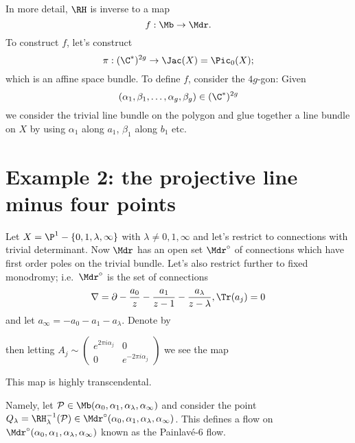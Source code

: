 \documentclass[etingof-dmod.tex]{subfiles}
\begin{document}
In more detail, $\RH$ is inverse to a map $$f : \Mb \rightarrow \Mdr.$$ To
construct $f$, let's construct $$\pi: (\C^*)^{2g} \rightarrow \Jac(X) =
\Pic_{0}(X);$$ which is an affine space bundle. To define $f$, consider the
$4g$-gon:
Given $$(\alpha_1,\beta_1, \ldots, \alpha_g,\beta_g) \in (\C^*)^{2g}$$ we
consider the trivial line bundle on the polygon and glue
together a line bundle on $X$ by using $\alpha_1$ along $a_1$, $\beta_1$ along $b_1$ etc.
\section{Example 2: the projective line minus four points}
Let $X = \P^1 - \{0,1,\lambda, \infty\}$ with $\lambda \neq 0,1,\infty$ and
let's restrict to connections with trivial determinant. Now $\Mdr$ has an open
set $\Mdr^{\circ}$ of connections which have first order poles on the trivial
bundle. Let's also restrict further to fixed monodromy; i.e.\ $\Mdr^{\circ}$
is the set of connections $$\nabla  = \partial  - \frac{a_0}{z} -
\frac{a_1}{z-1} - \frac{a_{\lambda}}{z-\lambda}, \Tr(a_j)=0$$
and let $a_{\infty} = -a_0 -a_1 - a_{\lambda}$. Denote by

then letting $A_j \sim \begin{pmatrix} e^{2\pi i\alpha_j} & 0 \\
    0 & e^{-2\pi i \alpha_j}\end{pmatrix}$ we see the map
This map is highly transcendental.

Namely, let $\mc{P} \in \Mb(\alpha_0,\alpha_1,\alpha_{\lambda}, \alpha_{\infty})$
and consider the point $Q_{\lambda} = \RH_{\lambda}^{-1}(\mc{P}) \in
\Mdr^{\circ}(\alpha_0,\alpha_1,\alpha_{\lambda}, \alpha_{\infty})$. This
defines a flow on $\Mdr^{\circ}(\alpha_0,\alpha_1,\alpha_{\lambda},
\alpha_{\infty})$ known as the Painlav\'e-6 flow.
\end{document}
